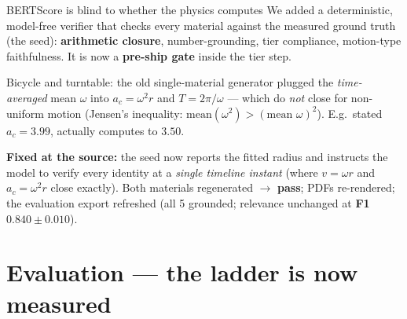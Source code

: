 \documentclass[aspectratio=169,10pt]{beamer}
\newcommand{\hl}[1]{{\bfseries\color{cAccent}#1}}
\begin{document}
\begin{frame}{BERTScore is blind to whether the physics computes}
\small
We added a deterministic, model-free verifier that checks every material against the measured
ground truth (the seed): \textbf{arithmetic closure}, number-grounding, tier compliance,
motion-type faithfulness. It is now a \hl{pre-ship gate} inside the tier step.
\vspace{0.4em}
\begin{tcolorbox}[colback=cAccent!6,colframe=cAccent,title=\footnotesize It found 2 of 5 already-shipped materials had wrong arithmetic,boxsep=2pt]
\scriptsize
Bicycle and turntable: the old single-material generator plugged the \emph{time-averaged} mean
$\omega$ into $a_c=\omega^2 r$ and $T=2\pi/\omega$ --- which do \emph{not} close for non-uniform
motion (Jensen's inequality: $\text{mean}(\omega^2) > (\text{mean }\omega)^2$).
E.g.\ stated $a_c = 3.99$, actually computes to $3.50$.
\end{tcolorbox}
\vspace{0.3em}
\textbf{Fixed at the source:} the seed now reports the fitted radius and instructs the model to
verify every identity at a \emph{single timeline instant} (where $v=\omega r$ and $a_c=\omega^2 r$
close exactly). Both materials regenerated $\rightarrow$ \textbf{pass}; PDFs re-rendered;
the evaluation export refreshed (all 5 grounded; relevance unchanged at \textbf{F1 $0.840\pm0.010$}).
\end{frame}

\section{Evaluation --- the ladder is now measured}
\end{document}
